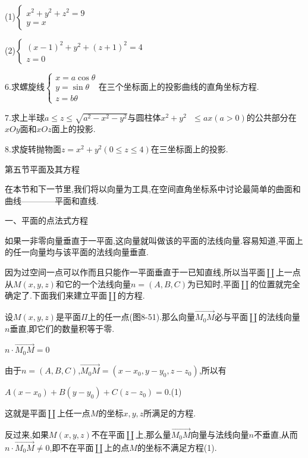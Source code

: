 \documentclass[oneside]{book}
\begin{document}
(1)$\left\{\begin{array}{l}{x^{2}+y^{2}+z^{2}=9} \\ {y=x}\end{array}\right.$

(2)$\left\{\begin{array}{l}{(x-1)^{2}+y^{2}+(z+1)^{2}=4} \\ {z=0}\end{array}\right.$

6.求螺旋线$\left\{\begin{array}{l}{x=a \cos \theta} \\ {y=\sin \theta} \\ {z=b \theta}\end{array}\right.$在三个坐标面上的投影曲线的直角坐标方程.

7.求上半球$a \leqslant z \leqslant \sqrt {{a^2} - {x^2} - {y^2}} $与圆柱体${x^2} + {y^2}{\text{ }} \leqslant ax\left( {a > 0} \right)$的公共部分在$xOy$面和$xOz$面上的投影.

8.求旋转抛物面$z = {x^2} + {y^2}\left( {0 \leqslant z \leqslant 4} \right)$在三坐标面上的投影.

第五节平面及其方程

在本节和下一节里,我们将以向量为工具,在空间直角坐标系中讨论最简单的曲面和曲线————平面和直线.

一、平面的点法式方程

如果一非零向量垂直于一平面,这向量就叫做该的平面的法线向量.容易知道,平面上的任一向量均与该平面的法线向量垂直.

因为过空间一点可以作而且只能作一平面垂直于一已知直线,所以当平面$\coprod $上一点从$M(x,y,z)$和它的一个法线向量$n = (A,B,C)$为已知时,平面$\coprod $的位置就完全确定了.下面我们来建立平面$\coprod $的方程.

设$M(x,y,z)$是平面$\Pi $上的任一点(图8-51).那么向量$\overrightarrow {{M_0}M} $必与平面$\coprod $的法线向量$n$垂直,即它们的数量积等于零.

$n \cdot \overrightarrow {{M_0}M}  = 0$

由于$n=(A,B,C)$,$\overrightarrow {{M_0}M}  = (x - {x_0},y - {y_0},z - {z_0})$,所以有

$A(x - {x_0}) + B(y - {y_0}) + C\left( {z - {z_0}} \right) = 0$.(1)

这就是平面$\coprod $上任一点$M$的坐标$x,y,z$所满足的方程.

反过来,如果$M(x,y,z)$不在平面$\coprod $上,那么量$\overrightarrow {{M_0}M} $向量与法线向量$n$不垂直,从而$n \cdot \overrightarrow {{M_0}M}  \ne 0$,即不在平面$\coprod $上的点$M$的坐标不满足方程(1).
\end{document}
